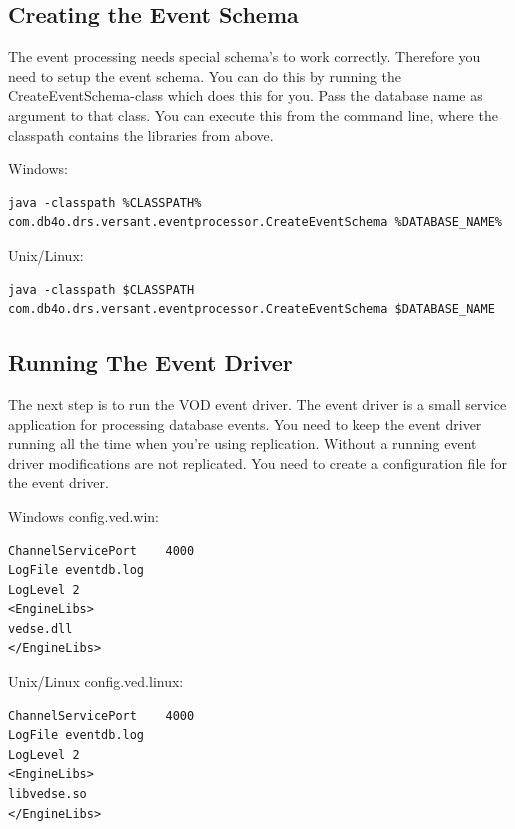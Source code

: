 \subsection{Creating the Event Schema}
\label{drs:db4o-replication-system-drs-vod-setup-event-processing:eventschema}

The event processing needs special schema's to work correctly. Therefore you need to setup the event schema. You can do this by running the CreateEventSchema-class which does this for you. Pass the database name as argument to that class. You can execute this from the command line, where the classpath contains the libraries from above.

Windows:

\begin{lstlisting}
java -classpath %CLASSPATH% com.db4o.drs.versant.eventprocessor.CreateEventSchema %DATABASE_NAME%
\end{lstlisting}

Unix/Linux:

\begin{lstlisting}
java -classpath $CLASSPATH com.db4o.drs.versant.eventprocessor.CreateEventSchema $DATABASE_NAME
\end{lstlisting}

\subsection{Running The Event Driver}
\label{drs:db4o-replication-system-drs-vod-setup-event-processing:eventdriver}

The next step is to run the VOD event driver. The event driver is a small service application for processing database events. You need to keep the event driver running all the time when you're using replication. Without a running event driver modifications are not replicated. You need to create a configuration file for the event driver.

Windows config.ved.win:

\begin{lstlisting}
ChannelServicePort    4000
LogFile eventdb.log
LogLevel 2
<EngineLibs>
vedse.dll
</EngineLibs>
\end{lstlisting}

Unix/Linux config.ved.linux:

\begin{lstlisting}
ChannelServicePort    4000
LogFile eventdb.log
LogLevel 2
<EngineLibs>
libvedse.so
</EngineLibs>
\end{lstlisting}

